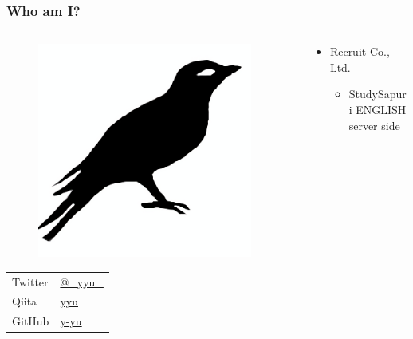 \begin{frame}
  \frametitle{Who am I?}
  
  \begin{columns}
    \begin{column}{0.3\textwidth}
      \begin{center}
        \begin{figure}
          \includegraphics[width=0.95\textwidth]{img/bird2x.png}
        \end{figure}
      \end{center}
 
      \begin{table}[h]
        \begin{tabular}{ll}
          Twitter & \href{https://twitter.com/\_yyu\_}{@\_yyu\_} \\
          Qiita &  \href{https://qiita.com/yyu}{yyu} \\
          GitHub &  \href{https://github.com/y-yu}{y-yu} \\
        \end{tabular}
      \end{table}
    \end{column}
    \begin{column}{0.7\textwidth}
      \begin{itemize}
        \item Recruit Co., Ltd.
        \begin{itemize}
          \item StudySapuri ENGLISH server side
        \end{itemize}


\end{itemize}
\end{column}
\end{columns}
\end{frame}
